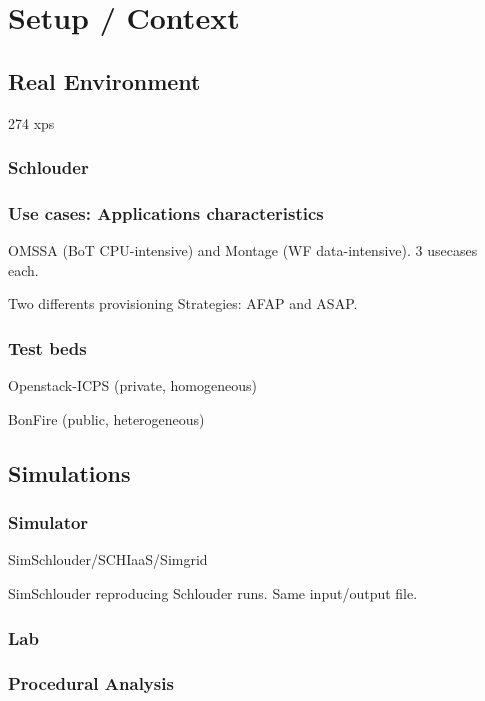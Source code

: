 \documentclass[parallelisme]{compas2017}
\begin{document}
\section{Setup / Context}


\subsection{Real Environment}

274 xps

\subsubsection{Schlouder}


\subsubsection{Use cases: Applications characteristics}

OMSSA (BoT CPU-intensive) and Montage (WF data-intensive). 3 usecases each.

Two differents provisioning Strategies: AFAP and ASAP.

\subsubsection{Test beds}

Openstack-ICPS (private, homogeneous) 

BonFire (public, heterogeneous)


\subsection{Simulations}

\subsubsection{Simulator}

SimSchlouder/SCHIaaS/Simgrid

SimSchlouder reproducing Schlouder runs. Same input/output file.

\subsubsection{Lab}

\subsubsection{Procedural Analysis}
\end{document}
